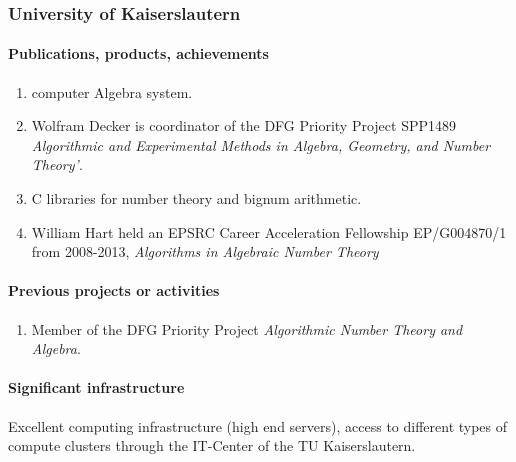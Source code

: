 \subsubsection{University of Kaiserslautern}






\paragraph{Publications, products, achievements}

\begin{enumerate}
\item {} computer Algebra system.
\item Wolfram Decker is coordinator of the DFG Priority Project SPP1489 \emph{Algorithmic and Experimental Methods in Algebra, Geometry, and
Number Theory'}.
\item {} C libraries for number theory and bignum arithmetic.
\item William Hart held an EPSRC Career Acceleration Fellowship EP/G004870/1 
from 2008-2013, \emph{Algorithms in Algebraic Number Theory}
\end{enumerate}

\paragraph{Previous projects or activities}

\begin{enumerate}
\item Member of the DFG Priority Project \emph{Algorithmic Number Theory and Algebra}.
\end{enumerate}

\paragraph{Significant infrastructure}

Excellent computing infrastructure (high end servers), access to 
different types of compute clusters through the IT-Center of the 
TU Kaiserslautern.


